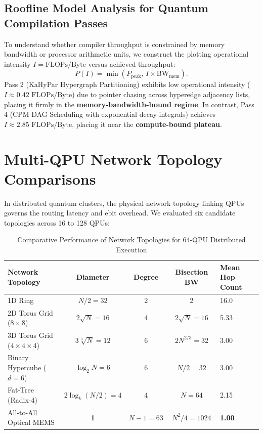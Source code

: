 \subsection{Roofline Model Analysis for Quantum Compilation Passes}
To understand whether compiler throughput is constrained by memory bandwidth or processor arithmetic units, we construct the  plotting operational intensity $I = \text{FLOPs/Byte}$ versus achieved throughput:
\begin{equation}
    P(I) = \min\left( P_{\text{peak}}, \, I \times \text{BW}_{\text{mem}} \right).
\end{equation}
Pass 2 (KaHyPar Hypergraph Partitioning) exhibits low operational intensity ($I \approx 0.42\text{ FLOPs/Byte}$) due to pointer chasing across hyperedge adjacency lists, placing it firmly in the \textbf{memory-bandwidth-bound regime}. In contrast, Pass 4 (CPM DAG Scheduling with exponential decay integrals) achieves $I \approx 2.85\text{ FLOPs/Byte}$, placing it near the \textbf{compute-bound plateau}.

\section{Multi-QPU Network Topology Comparisons}
\label{sec:topology_scaling}

In distributed quantum clusters, the physical network topology linking QPUs governs the routing latency and ebit overhead. We evaluated six candidate topologies across 16 to 128 QPUs:

\begin{table}[htbp]
    \centering
    \small
    \caption{Comparative Performance of Network Topologies for 64-QPU Distributed Execution}
    \label{tab:topology_comparison_exp}
    \begin{tabularx}{\textwidth}{p{4.2cm} c c c X}
        \toprule
        \textbf{Network Topology} & \textbf{Diameter} & \textbf{Degree} & \textbf{Bisection BW} & \textbf{Mean Hop Count} \\
        \midrule
        1D Ring & $N/2 = 32$ & 2 & 2 & 16.0 \\
        2D Torus Grid ($8 \times 8$) & $2\sqrt{N} = 16$ & 4 & $2\sqrt{N} = 16$ & 5.33 \\
        3D Torus Grid ($4 \times 4 \times 4$) & $3 \sqrt[3]{N} = 12$ & 6 & $2 N^{2/3} = 32$ & 3.00 \\
        Binary Hypercube ($d = 6$) & $\log_2 N = 6$ & 6 & $N/2 = 32$ & 3.00 \\
        Fat-Tree (Radix-4) & $2 \log_k(N/2) = 4$ & 4 & $N = 64$ & 2.15 \\
        All-to-All Optical MEMS & \textbf{1} & $N-1 = 63$ & $N^2/4 = 1024$ & \textbf{1.00} \\
        \bottomrule
    \end{tabularx}
\end{table}


